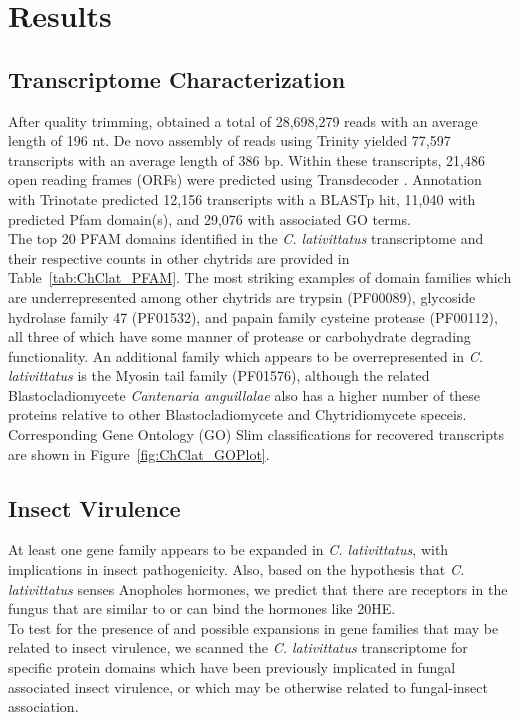 \section{Results}
\subsection{Transcriptome Characterization}
After quality trimming, obtained a total of 28,698,279 reads with an average length of 196 nt. De novo assembly of reads using Trinity \cite{Grabherr2011} yielded 77,597 transcripts with an average length of 386 bp. Within these transcripts, 21,486 open reading frames (ORFs) were predicted using Transdecoder \cite{Haas2013}. Annotation with Trinotate predicted 12,156 transcripts with a BLASTp hit, 11,040 with predicted Pfam domain(s), and 29,076 with associated GO terms. \\
\indent The top 20 PFAM domains identified in the \textit{C. lativittatus} transcriptome and their respective counts in other chytrids are provided in Table~\ref{tab:ChClat_PFAM}. The most striking examples of domain families which are underrepresented among other chytrids are trypsin (PF00089), glycoside hydrolase family 47 (PF01532), and papain family cysteine protease (PF00112), all three of which have some manner of protease or carbohydrate degrading functionality. An additional family which appears to be overrepresented in \textit{C. lativittatus} is the Myosin tail family (PF01576), although the related Blastocladiomycete \textit{Cantenaria anguillalae} also has a higher number of these proteins relative to other Blastocladiomycete and Chytridiomycete speceis. Corresponding Gene Ontology (GO) Slim classifications for recovered transcripts are shown in Figure~\ref{fig:ChClat_GOPlot}. \\
\subsection{Insect Virulence} 
At least one gene family appears to be expanded in \textit{C. lativittatus}, with implications in insect pathogenicity. Also, based on the hypothesis that \textit{C. lativittatus} senses Anopholes hormones, we predict that there are receptors in the fungus that are similar to or can bind the hormones like 20HE. \\
\indent To test for the presence of and possible expansions in gene families that may be related to insect virulence, we scanned the \textit{C. lativittatus} transcriptome for specific protein domains which have been previously implicated in fungal associated insect virulence, or which may be otherwise related to fungal-insect association. \\
